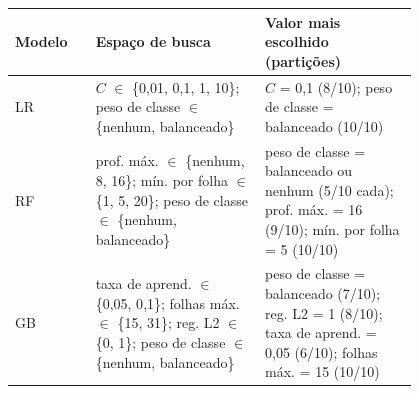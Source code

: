 \begin{tabular}{@{}l>{\raggedright\arraybackslash}p{0.42\linewidth}>{\raggedright\arraybackslash}p{0.38\linewidth}@{}}
\toprule
Modelo & Espaço de busca & Valor mais escolhido (partições) \\
\midrule
LR & $C$ $\in$ \{0{,}01, 0{,}1, 1, 10\}; peso de classe $\in$ \{nenhum, balanceado\} & $C$ = 0{,}1 (8/10); peso de classe = balanceado (10/10) \\
\addlinespace
RF & prof. máx. $\in$ \{nenhum, 8, 16\}; mín. por folha $\in$ \{1, 5, 20\}; peso de classe $\in$ \{nenhum, balanceado\} & peso de classe = balanceado ou nenhum (5/10 cada); prof. máx. = 16 (9/10); mín. por folha = 5 (10/10) \\
\addlinespace
GB & taxa de aprend. $\in$ \{0{,}05, 0{,}1\}; folhas máx. $\in$ \{15, 31\}; reg. L2 $\in$ \{0, 1\}; peso de classe $\in$ \{nenhum, balanceado\} & peso de classe = balanceado (7/10); reg. L2 = 1 (8/10); taxa de aprend. = 0{,}05 (6/10); folhas máx. = 15 (10/10) \\
\bottomrule
\end{tabular}
